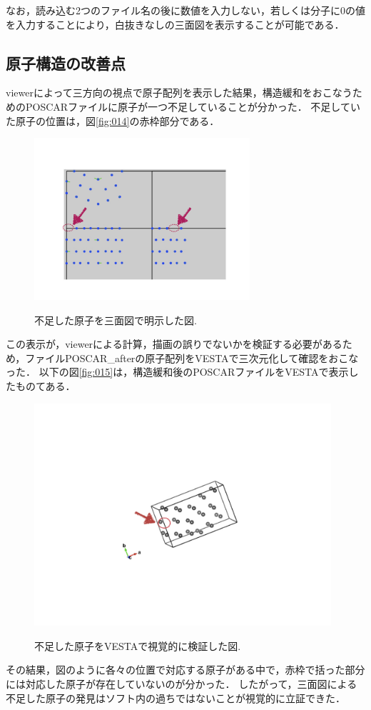なお，読み込む2つのファイル名の後に数値を入力しない，若しくは分子に0の値を入力することにより，白抜きなしの三面図を表示することが可能である．
\subsection{原子構造の改善点}
viewerによって三方向の視点で原子配列を表示した結果，構造緩和をおこなうためのPOSCARファイルに原子が一つ不足していることが分かった．
不足していた原子の位置は，図\ref{fig:014}の赤枠部分である．

\begin{figure}[htbp]\begin{center}
\includegraphics[width=8cm,bb= 0 0 937 753]{../figs/./boundary_narita.014.jpeg}
\caption{不足した原子を三面図で明示した図.}
\label{fig:014}
\label{default}\end{center}\end{figure}
この表示が，viewerによる計算，描画の誤りでないかを検証する必要があるため，ファイルPOSCAR\_afterの原子配列をVESTAで三次元化して確認をおこなった．
以下の図\ref{fig:015}は，構造緩和後のPOSCARファイルをVESTAで表示したものてある．

\begin{figure}[htbp]\begin{center}
\includegraphics[width=11cm,bb= 0 0 937 753]{../figs/./boundary_narita.015.jpeg}
\caption{不足した原子をVESTAで視覚的に検証した図.}
\label{fig:015}
\label{default}\end{center}\end{figure}
その結果，図のように各々の位置で対応する原子がある中で，赤枠で括った部分には対応した原子が存在していないのが分かった．
したがって，三面図による不足した原子の発見はソフト内の過ちではないことが視覚的に立証できた．

